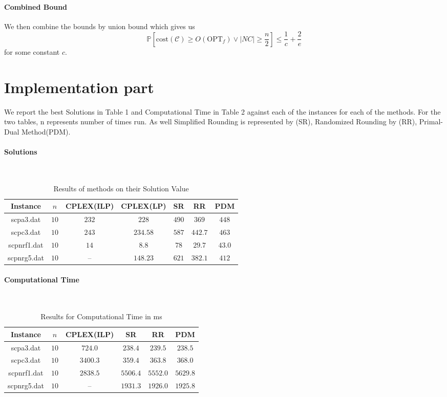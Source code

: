 \documentclass[11pt,a4paper,english]{article}
\newcommand{\PP}{\mathbb{P}}      %
\begin{document}
\paragraph{Combined Bound}
We then combine the bounds by union bound which gives us
$$\PP\left[\mathrm{cost}(\mathcal{C}) \geq O(\mathrm{OPT}_f) \vee  |NC| \geq \frac{n}{2} \right]
\leq \frac{1}{c} + \frac{2}{e}$$
for some constant $c$.

\clearpage


\section{Implementation part}

We report the best Solutions in Table 1 and Computational Time in Table 2 against each of the instances for each of the methods. For the two tables, n represents number of times run. As well Simplified Rounding is represented by (SR), Randomized Rounding by (RR), Primal-Dual Method(PDM).
\paragraph{Solutions}\mbox{}\\


\begin{table}[h!]
  \centering
  \begin{tabular}{|c|c|c|c|c|c|c|}\hline
    Instance& $n$& CPLEX(ILP)&CPLEX(LP)&SR&RR&PDM  \\\hline
    scpa3.dat &$10$&$232$ & $228$ & $490$& $369$ & $448$  \\
    scpc3.dat &$10$&$243$ & $234.58$ & $587$& $442.7$ & $463$ \\
    scpnrf1.dat &$10$&$14$ & $8.8$ & $78$& $29.7$ & $43.0$  \\
    scpnrg5.dat &$10$&-- & $148.23$ & $621$& $382.1$ & $412$  \\\hline
  \end{tabular}
  \caption{Results of methods on their Solution Value}
  \label{tab:res}
\end{table}

\paragraph{Computational Time}\mbox{}\\

\begin{table}[h!]
  \centering
  \begin{tabular}{|c|c|c|c|c|c|}\hline
    Instance& $n$& CPLEX(ILP)&SR&RR&PDM \\\hline
    scpa3.dat &$10$&$724.0$ & $238.4$& $239.5$ & $238.5$  \\
    scpc3.dat &$10$ & $3400.3$ & $359.4$& $363.8$ & $368.0$ \\
    scpnrf1.dat	 &$10$ & $2838.5$ & $5506.4$& $5552.0$ & $5629.8$  \\
    scpnrg5.dat &$10$ & -- & $1931.3$& $1926.0$ & $1925.8$  \\\hline
  \end{tabular}
  \caption{Results for Computational Time in ms}
  \label{tab:res}
\end{table}
\end{document}
